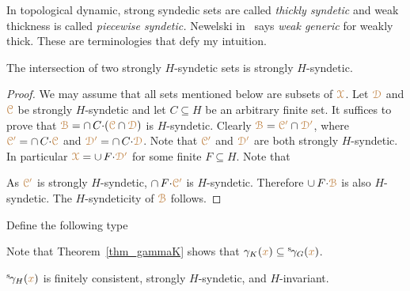 \noindent\llap{\textcolor{red}{\Large\warning}\kern1.5ex}\ignorespaces
In topological dynamic, strong syndedic sets are called \textit{thickly syndetic\/} and weak thickness is called \textit{piecewise syndetic.}
Newelski in~\cite{Newelski09} says \textit{weak generic\/} for weakly thick.
These are terminologies that defy my intuition.

\begin{lemma}\label{lem_strongly_syndetic}
  The intersection of two strongly $H$-syndetic sets is strongly $H$-syndetic.
\end{lemma}

\begin{proof}
  We may assume that all sets mentioned below are subsets of ${\color{brown}\EuScript X}$.
  Let ${\color{brown}\EuScript D}$ and ${\color{brown}\EuScript C}$ be strongly $H$-syndetic and let $C\subseteq H$ be an arbitrary finite set.
  It suffices to prove that ${\color{brown}\EuScript B}=\cap\, C{\cdot}({\color{brown}\EuScript C}\cap{\color{brown}\EuScript D})$ is $H$-syndetic. 
  Clearly ${\color{brown}\EuScript B}={\color{brown}\EuScript C'}\cap{\color{brown}\EuScript D'}$, where ${\color{brown}\EuScript C'}=\cap\, C{\cdot}{\color{brown}\EuScript C}$ and ${\color{brown}\EuScript D'}=\cap\, C{\cdot}{\color{brown}\EuScript D}$.
  Note that ${\color{brown}\EuScript C'}$ and ${\color{brown}\EuScript D'}$ are both strongly $H$-syndetic.
  In particular ${\color{brown}\EuScript X}=\cup\,F{\cdot}\color{brown}\EuScript D'$ for some finite $F\subseteq H$.
  Note that
  

  
  
  
  As ${\color{brown}\EuScript C'}$ is strongly $H$-syndetic, $\cap\, F{\cdot}{\color{brown}\EuScript C'}$ is $H$-syndetic.
  Therefore $\cup\,F{\cdot}{\color{brown}\EuScript B}$ is also $H$-syndetic.
  The $H$-syndeticity of ${\color{brown}\EuScript B}$ follows.
\end{proof}

Define the following type

\smallskip

Note that Theorem~\ref{thm_gammaK} shows that $\gamma_K({\color{brown} x})\subseteq{}^{\rm s}\kern-.2ex\gamma_G({\color{brown} x})$.

\begin{corollary}\label{corol_str_gen}
  ${}^{\rm s}\kern-.2ex\gamma_H({\color{brown} x})$ is finitely consistent, strongly $H$-syndetic, and $H$-invariant.
\end{corollary}

